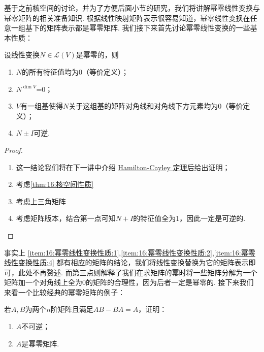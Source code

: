 基于之前核空间的讨论，并为了方便后面小节的研究，我们将讲解幂零线性变换与幂零矩阵的相关准备知识. 根据线性映射矩阵表示很容易知道，幂零线性变换在任意一组基下的矩阵表示都是幂零矩阵. 我们接下来首先讨论幂零线性变换的一些基本性质：
\begin{theorem} \label{thm:16:幂零线性变换性质}
    设线性变换$N\in \mathcal{L}(V)$是幂零的，则
    \begin{enumerate}
        \item \label{item:16:幂零线性变换性质:1}
              $N$的所有特征值均为0（等价定义）；

        \item \label{item:16:幂零线性变换性质:2}
              $N^{\dim V}$=0；

        \item \label{item:16:幂零线性变换性质:3}
              $V$有一组基使得$N$关于这组基的矩阵对角线和对角线下方元素均为0（等价定义）；

        \item \label{item:16:幂零线性变换性质:4}
              $N\pm I$可逆.
    \end{enumerate}
\end{theorem}

\begin{proof}
    \begin{enumerate}
        \item 这一结论我们将在下一讲中介绍 \hyperref[thm:21:HC]{Hamilton-Cayley 定理}后给出证明；

        \item 考虑\autoref{thm:16:核空间性质}

        \item 考虑上三角矩阵

        \item 考虑矩阵版本，结合第一点可知$N+I$的特征值全为1，因此一定是可逆的.
    \end{enumerate}
\end{proof}

事实上 \ref*{item:16:幂零线性变换性质:1},\ref*{item:16:幂零线性变换性质:2},\ref*{item:16:幂零线性变换性质:4} 都有相应的矩阵的结论，我们将线性变换替换为它的矩阵表示即可，此处不再赘述. 而第三点则解释了我们在求矩阵的幂时将一些矩阵分解为一个矩阵加一个对角线上全为0的矩阵的合理性，因为后者一定是幂零的. 接下来我们来看一个比较经典的幂零矩阵的例子：
\begin{example}
    若$A,B$为两个$n$阶矩阵且满足$AB-BA=A$，证明：
    \begin{enumerate}
        \item $A$不可逆；

        \item $A$是幂零矩阵.
    \end{enumerate}
\end{example}

